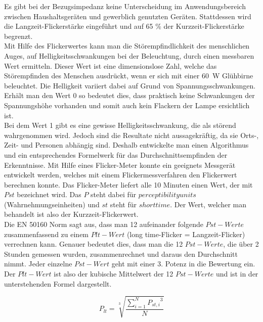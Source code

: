 Es gibt bei der Bezugsimpedanz keine Unterscheidung im Anwendungsbereich zwischen Haushaltsgeräten und gewerblich genutzten Geräten. Stattdessen wird die Langzeit-Flickerstärke eingeführt und auf 65 \% der Kurzzeit-Flickerstärke begrenzt.\\
Mit Hilfe des Flickerwertes kann man die Störempfindlichkeit des menschlichen Auges, auf Helligkeitsschwankungen bei der Beleuchtung, durch einen messbaren Wert ermitteln. Dieser Wert ist eine dimensionslose Zahl, welche das Störempfinden des Menschen ausdrückt, wenn er sich mit einer \SI{60}{W} Glühbirne beleuchtet. Die Helligkeit variiert dabei auf Grund von Spannungsschwankungen.
Erhält man den Wert 0 so bedeutet dies, dass praktisch keine Schwankungen der Spannungshöhe vorhanden und somit auch kein Flackern der Lampe ersichtlich ist.\\
Bei dem Wert 1 gibt es eine gewisse Helligkeitsschwankung, die als störend wahrgenommen wird. Jedoch sind die Resultate nicht aussagekräftig, da sie Orts-, Zeit- und Personen abhängig sind. Deshalb entwickelte man einen Algorithmus und ein entsprechendes Formelwerk für das Durchschnittsempfinden der Erkenntnisse. Mit Hilfe eines Flicker-Meter konnte ein geeignets Messgerät entwickelt werden, welches mit einem Flickermessverfahren den Flickerwert berechnen konnte. Das Flicker-Meter liefert alle 10 Minuten einen Wert, der mit $Pst$ bezeichnet wird. Das $P$ steht dabei für $perceptibility units$ (Wahrnehmungseinheiten) und $st$ steht für $short time$. Der Wert, welcher man behandelt ist also der Kurzzeit-Flickerwert.\\
Die EN 50160 Norm sagt aus, dass man 12 aufeinander folgende $Pst-Werte$ zusammenfassend zu einem $Plt-Wert$ (long time-Flicker = Langzeit-Flicker) verrechnen kann. Genauer bedeutet dies, dass man die 12 $Pst-Werte$, die über 2 Stunden gemessen wurden, zusammenrechnet und daraus den Durchschnitt nimmt. Jeder einzelne $Pst-Wert$ geht mit einer 3. Potenz in die Bewertung ein. Der $Plt-Wert$ ist also der kubische Mittelwert der 12 $Pst-Werte$ und ist in der unterstehenden Formel dargestellt.


\begin{equation}\label{eq:Plt}
P_{lt} = {\sqrt[3]{\frac{\sum_{i=1}^{N} {P_{st,i}}^3}{N}}}
\end{equation}


